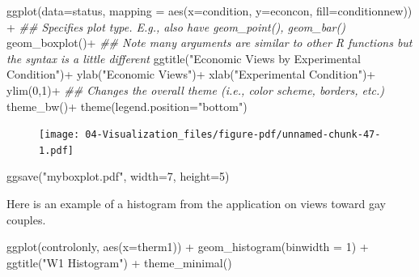 \documentclass[
  letterpaper,
  DIV=11,
  numbers=noendperiod]{scrreprt}
\newenvironment{Shaded}{\begin{snugshade}}{\end{snugshade}}
\newcommand{\AttributeTok}[1]{\textcolor[rgb]{0.40,0.45,0.13}{#1}}
\newcommand{\DecValTok}[1]{\textcolor[rgb]{0.68,0.00,0.00}{#1}}
\newcommand{\DocumentationTok}[1]{\textcolor[rgb]{0.37,0.37,0.37}{\textit{#1}}}
\newcommand{\FunctionTok}[1]{\textcolor[rgb]{0.28,0.35,0.67}{#1}}
\newcommand{\NormalTok}[1]{\textcolor[rgb]{0.00,0.23,0.31}{#1}}
\newcommand{\SpecialCharTok}[1]{\textcolor[rgb]{0.37,0.37,0.37}{#1}}
\newcommand{\StringTok}[1]{\textcolor[rgb]{0.13,0.47,0.30}{#1}}
\begin{document}
\begin{Shaded}
\begin{Highlighting}[]
\FunctionTok{ggplot}\NormalTok{(}\AttributeTok{data=}\NormalTok{status, }\AttributeTok{mapping =} \FunctionTok{aes}\NormalTok{(}\AttributeTok{x=}\NormalTok{condition, }\AttributeTok{y=}\NormalTok{econcon, }\AttributeTok{fill=}\NormalTok{conditionnew)) }\SpecialCharTok{+}
  \DocumentationTok{\#\# Specifies plot type. E.g., also have geom\_point(), geom\_bar()}
  \FunctionTok{geom\_boxplot}\NormalTok{()}\SpecialCharTok{+}
  \DocumentationTok{\#\# Note many arguments are similar to other R functions but the syntax is a little different}
  \FunctionTok{ggtitle}\NormalTok{(}\StringTok{"Economic Views by Experimental Condition"}\NormalTok{)}\SpecialCharTok{+}
  \FunctionTok{ylab}\NormalTok{(}\StringTok{"Economic Views"}\NormalTok{)}\SpecialCharTok{+}
  \FunctionTok{xlab}\NormalTok{(}\StringTok{"Experimental Condition"}\NormalTok{)}\SpecialCharTok{+}
  \FunctionTok{ylim}\NormalTok{(}\DecValTok{0}\NormalTok{,}\DecValTok{1}\NormalTok{)}\SpecialCharTok{+}
  \DocumentationTok{\#\# Changes the overall theme (i.e., color scheme, borders, etc.)}
  \FunctionTok{theme\_bw}\NormalTok{()}\SpecialCharTok{+}
  \FunctionTok{theme}\NormalTok{(}\AttributeTok{legend.position=}\StringTok{"bottom"}\NormalTok{)}
\end{Highlighting}
\end{Shaded}

\begin{figure}[H]

{\centering \texttt{[image: 04-Visualization\_files/figure-pdf/unnamed-chunk-47-1.pdf]}

}

\end{figure}

\begin{Shaded}
\begin{Highlighting}[]
\FunctionTok{ggsave}\NormalTok{(}\StringTok{"myboxplot.pdf"}\NormalTok{, }\AttributeTok{width=}\DecValTok{7}\NormalTok{, }\AttributeTok{height=}\DecValTok{5}\NormalTok{)}
\end{Highlighting}
\end{Shaded}

Here is an example of a histogram from the application on views toward
gay couples.

\begin{Shaded}
\begin{Highlighting}[]
\FunctionTok{ggplot}\NormalTok{(controlonly, }\FunctionTok{aes}\NormalTok{(}\AttributeTok{x=}\NormalTok{therm1)) }\SpecialCharTok{+}
  \FunctionTok{geom\_histogram}\NormalTok{(}\AttributeTok{binwidth =} \DecValTok{1}\NormalTok{) }\SpecialCharTok{+}
  \FunctionTok{ggtitle}\NormalTok{(}\StringTok{"W1 Histogram"}\NormalTok{) }\SpecialCharTok{+}
  \FunctionTok{theme\_minimal}\NormalTok{()}
\end{Highlighting}
\end{Shaded}
\end{document}
